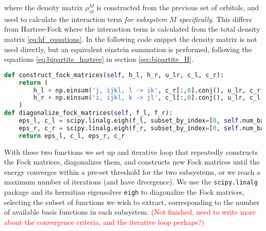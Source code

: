\documentclass{subfiles}
\begin{document}
where the density matrix $\rho_{\gamma\delta}^{M}$ is constructed from the previous set of orbitals, and used to calculate the interaction term \emph{for subsystem $M$ specifically}. This differs from Hartree-Fock where the interaction term is calculated from the total density matrix \eqref{eq:hf_equations}. In the following code snippet the density matrix is not used directly, but an equivalent einstein summation is performed, following the equations \eqref{eq:bipartite_hartree} in section \ref{sec:bipartite_H}.
\begin{lstlisting}[language=Python]
def construct_fock_matrices(self, h_l, h_r, u_lr, c_l, c_r):
    return (
        h_l + np.einsum('j, ijkl, l -> ik', c_r[:,0].conj(), u_lr, c_r[:,0]),
        h_r + np.einsum('i, ijkl, k -> jl', c_l[:,0].conj(), u_lr, c_l[:,0]),
    )
def diagonalize_fock_matrices(self, f_l, f_r):
    eps_l, c_l = scipy.linalg.eigh(f_l, subset_by_index=[0, self.num_basis_l - 1])
    eps_r, c_r = scipy.linalg.eigh(f_r, subset_by_index=[0, self.num_basis_r - 1])
    return eps_l, c_l, eps_r, c_r
\end{lstlisting}
With these two functions we set up and iterative loop that repeatedly constructs the Fock matrices, diagonalizes them, and constructs new Fock matrices until the energy converges within a pre-set threshold for the two subsystems, or we reach a maximum number of iterations (and have divergence). We use the \texttt{scipy.linalg}\cite{2020SciPy-NMeth} package and its hermitian eigensolver \texttt{eigh} to diagonalize the Fock matrices, selecting the subset of functions we wish to extract, corresponding to the number of available basis functions in each subsystem. \textcolor{red}{(Not finished, need to write more about the convergence criteria, and the iterative loop perhaps?)}
\end{document}

